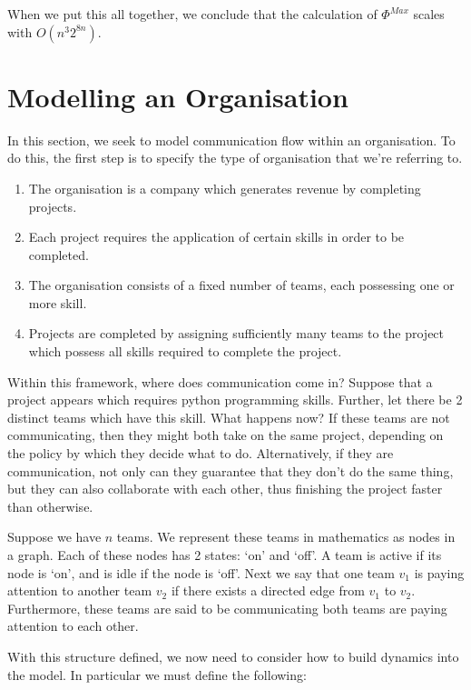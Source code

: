 When we put this all together, we conclude that the calculation of $\Phi^{Max}$ scales with $O(n^3 2^{8n})$.


\section{Modelling an Organisation}

In this section, we seek to model communication flow within an organisation. To do this, the first step is to specify the type of organisation that we're referring to. 

\begin{enumerate}
	\item The organisation is a company which generates revenue by completing projects.
	
	\item Each project requires the application of certain skills in order to be completed.
	
	\item The organisation consists of a fixed number of teams, each possessing one or more skill.
	
	\item Projects are completed by assigning sufficiently many teams to the project which possess all skills required to complete the project.
\end{enumerate} 

Within this framework, where does communication come in? Suppose that a project appears which requires python programming skills. Further, let there be 2 distinct teams which have this skill. What happens now? If these teams are not communicating, then they might both take on the same project, depending on the policy by which they decide what to do. Alternatively, if they are communication, not only can they guarantee that they don't do the same thing, but they can also collaborate with each other, thus finishing the project faster than otherwise.

Suppose we have $n$ teams. We represent these teams in mathematics as nodes in a graph. Each of these nodes has 2 states: `on' and `off'. A team is active if its node is `on', and is idle if the node is `off'. Next we say that one team $v_1$ is paying attention to another team $v_2$ if there exists a directed edge from $v_1$ to $v_2$. Furthermore, these teams are said to be communicating both teams are paying attention to each other.

With this structure defined, we now need to consider how to build dynamics into the model. In particular we must define the following:

